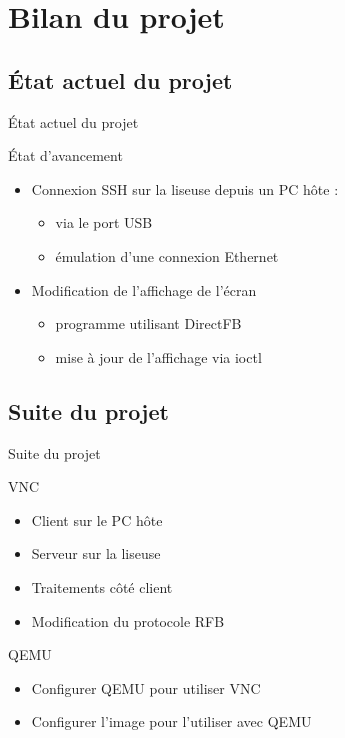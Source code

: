 \section[Bilan]{Bilan du projet}
\subsection[État actuel]{État actuel du projet}
\begin{frame}{État actuel du projet}

\begin{block}{État d'avancement}

	\begin{itemize}
		\item Connexion SSH sur la liseuse depuis un PC hôte :
		\begin{itemize}
			\item via le port USB
			\item émulation d'une connexion Ethernet
		\end{itemize}
		\item Modification de l'affichage de l'écran
		\begin{itemize}
			\item programme utilisant DirectFB
			\item mise à jour de l'affichage via ioctl
		\end{itemize}
	\end{itemize}

\end{block}

\end{frame}

\subsection[Suite]{Suite du projet}
\begin{frame}{Suite du projet}

\begin{block}{VNC}
	\begin{itemize}
		\item Client sur le PC hôte
		\item Serveur sur la liseuse
		\item Traitements côté client
		\item Modification du protocole RFB
	\end{itemize}
\end{block}

\begin{block}{QEMU}
	\begin{itemize}
		\item Configurer QEMU pour utiliser VNC
		\item Configurer l'image pour l'utiliser avec QEMU
	\end{itemize}
\end{block}

\end{frame}